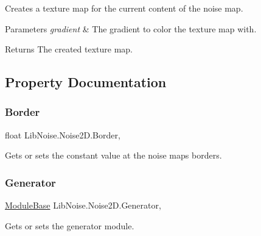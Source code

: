 Creates a texture map for the current content of the noise map. 


\begin{DoxyParams}{Parameters}
{\em gradient} & The gradient to color the texture map with.\\
\hline
\end{DoxyParams}
\begin{DoxyReturn}{Returns}
The created texture map.
\end{DoxyReturn}


\subsection{Property Documentation}
\mbox{\label{class_lib_noise_1_1_noise2_d_a2fe599fb07d0f17706cbd26b246660e3}} 
\subsubsection{\texorpdfstring{Border}{Border}}
{\footnotesize\ttfamily float Lib\+Noise.\+Noise2\+D.\+Border\hspace{0.3cm}{\ttfamily [get]}, {\ttfamily [set]}}



Gets or sets the constant value at the noise maps borders. 

\mbox{\label{class_lib_noise_1_1_noise2_d_a02c039a4f7a9e13d7a848ed5bf83dbcd}} 
\subsubsection{\texorpdfstring{Generator}{Generator}}
{\footnotesize\ttfamily \hyperlink{class_lib_noise_1_1_module_base}{Module\+Base} Lib\+Noise.\+Noise2\+D.\+Generator\hspace{0.3cm}{\ttfamily [get]}, {\ttfamily [set]}}



Gets or sets the generator module. 

\mbox{\label{class_lib_noise_1_1_noise2_d_adebca9dc1a1ab05075a8511fae245f27}} 
